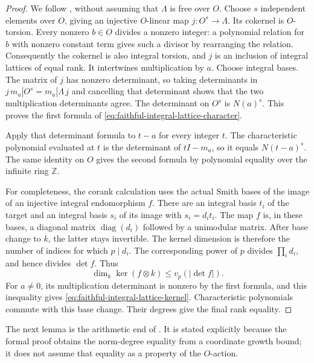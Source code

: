 \begin{proof}
We follow , without assuming that
\(\Lambda\) is free over \(O\).
Choose \(s\) independent elements over \(O\), giving an injective
\(O\)-linear map \(j:O^s\to\Lambda\).
Its cokernel is \(O\)-torsion.
Every nonzero \(b\in O\) divides a nonzero integer: a polynomial
relation for \(b\) with nonzero constant term gives such a divisor
by rearranging the relation.
Consequently the cokernel is also integral torsion, and \(j\)
is an inclusion of integral lattices of equal rank.
It intertwines multiplication by \(a\).
Choose integral bases.  The matrix of \(j\) has nonzero determinant,
so taking determinants in
\(j\,m_a|O^s=m_a|\Lambda\,j\) and cancelling that determinant
shows that the two multiplication determinants agree.
The determinant on \(O^s\) is \(N(a)^s\).
This proves the first formula of \eqref{eq:faithful-integral-lattice-character}.

Apply that determinant formula to \(t-a\) for every integer \(t\).
The characteristic polynomial evaluated at \(t\) is the determinant
of \(tI-m_a\), so it equals \(N(t-a)^s\).
The same identity on \(O\) gives the second formula by polynomial
equality over the infinite ring \(\mathbb Z\).

For completeness, the corank calculation uses the actual Smith
bases of the image of an injective integral endomorphism \(f\).
There are an integral basis \(t_i\) of the target and an integral
basis \(s_i\) of its image with \(s_i=d_i t_i\).
The map \(f\) is, in these bases, a diagonal matrix
\(\operatorname{diag}(d_i)\) followed by a unimodular matrix.
After base change to \(k\), the latter stays invertible.
The kernel dimension is therefore the number of indices for
which \(p\mid d_i\).  The corresponding power of \(p\) divides
\(\prod_i d_i\), and hence divides \(\det f\).
Thus
\[
       \dim_k\ker(f\otimes k)\le v_p(|\det f|).
\]
For \(a\ne0\), its multiplication determinant is nonzero by the
first formula, and this inequality gives
\eqref{eq:faithful-integral-lattice-kernel}.
Characteristic polynomials commute with this base change.
Their degrees give the final rank equality.
\end{proof}

The next lemma is the arithmetic end of
.  It is stated explicitly because
the formal proof obtains the norm-degree equality from a coordinate
growth bound; it does not assume that equality as a property of
the \(O\)-action.

